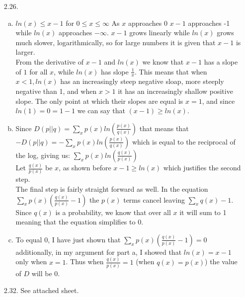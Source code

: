 \documentclass[10pt]{article}
\begin{document}
\begin{itemize}
        \item[2.26.]
        		\begin{enumerate}[a)]
			\item $ln(x) \leq x-1$ for $0\leq x \leq \infty$
				As $x$ approaches 0 $x-1$ approaches -1 while $ln(x)$ approaches $-\infty$. $x-1$ 
				grows linearly while $ln(x)$ grows much slower, logarithmically, so for large numbers
				it is given that $x-1$ is larger.\\
				From the derivative of $x-1$ and $ln(x)$ we know that $x-1$ has a slope of $1$ for all 
				$x$, while $ln(x)$ has slope $\frac{1}{x}$. This means that when $x<1, ln(x)$ has an
				increasingly steep negative sloap, more steeply negative than 1, and when $x>1$ 
				it has an increasingly shallow 
				positive slope. The only point at which their slopes are equal is $x=1$, and since
				$ln(1)=0=1-1$ we can say that $(x-1)\geq ln(x)$. 
			\item
				Since $D(p||q)=\sum_{x}p(x)ln\left(\frac{p(x)}{q(x)}\right)$ that means that
				$-D(p||q)=-\sum_{x}p(x)ln\left(\frac{p(x)}{q(x)}\right)$ which is equal to the
				reciprocal of the log, giving us: $\sum_{x}p(x)ln\left(\frac{q(x)}{p(x)}\right)$\\
				Let $\frac{q(x)}{p(x)}$ be $x$, as shown before $x-1\geq ln(x)$ which 
				justifies the second step.\\
				The final step is fairly straight forward as well. In the equation
				$\sum_{x}p(x)\left(\frac{q(x)}{p(x)}-1\right)$ the $p(x)$ terms cancel
				leaving $\sum_{x}q(x)-1$. Since $q(x)$ is a probability, we know
				that over all $x$ it will sum to 1 meaning that the equation simplifies
				to 0.
			\item
				To equal 0, I have just shown that $\sum_{x}p(x)\left(\frac{q(x)}{p(x)}-1\right)=0$
				additionally, in my argument for part a, I showed that $ln(x) = x-1$ only when
				$x=1$. Thus when $\frac{q(x)}{p(x)}=1$ (when $q(x)=p(x)$) the value of $D$ 
				will be 0.
		\end{enumerate}
          
        \item[2.32.] See attached sheet.

\end{itemize}
\end{document}
